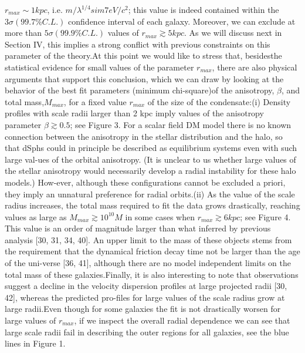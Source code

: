 \documentclass{article}
\begin{document}
\begin{multicols}{2}
$r_{max}\sim1 kpc$, i.e. $m/\lambda^{1/4}sim7eV/c^2$; this value is indeed contained within the $3\sigma(99.7\% C.L.)$ confidence interval of each galaxy. Moreover, we can exclude at more than $5\sigma(99.9\% C.L.)$ values of $r_{max}\gtrsim 5kpc$.  As we will discuss next  in  Section  IV,  this  implies  a  strong  conflict  with previous constraints on this parameter of the theory.At  this  point  we  would  like  to  stress  that,  besidesthe  statistical  evidence  for  small  values  of  the  parameter $r_{max}$, there are also physical arguments that support this conclusion, which we can draw by looking at the behavior of the best fit parameters (minimum chi-square)of the anisotropy, $\beta$,  and total mass,$M_{max}$,  for a fixed value $r_{max}$ of the size of the condensate:(i) Density profiles with scale radii larger than 2 kpc imply  values  of  the  anisotropy  parameter $\beta\gtrsim0.5$;  see Figure 3.  For a scalar field DM model there is no known connection between the anisotropy in the stellar distribution and the halo, so that dSphs could in principle be described as equilibrium systems even with such large val-ues of the orbital anisotropy.  (It is unclear to us whether large  values  of  the  stellar  anisotropy  would  necessarily develop a radial instability for these halo models.)  How-ever,  although  these  configurations  cannot  be  excluded a priori,  they  imply  an  unnatural  preference  for  radial orbits.(ii) As the value of the scale radius increases, the total mass required to fit the data grows drastically, reaching values as large as $M_{max}\gtrsim10^{10}M$ in some cases when $r_{max}\gtrsim6kpc$; see  Figure  4.   This  value  is  an  order  of magnitude larger than what inferred by previous analysis [30, 31, 34, 40].  An upper limit to the mass of these objects stems from the requirement that the dynamical friction decay time not be larger than the age of the uni-verse [36, 41], although there are no model independent limits on the total mass of these galaxies.Finally, it is also interesting to note that observations suggest  a  decline  in  the  velocity  dispersion  profiles  at large projected radii [30, 42], whereas the predicted pro-files for large values of the scale radius grow at large radii.Even though for some galaxies the fit is not drastically worsen for large values of $r_{max}$, if we inspect the overall radial dependence we can see that large scale radii fail in describing the outer regions for all galaxies, see the blue lines in Figure 1. 
\end{multicols}
\end{document}
